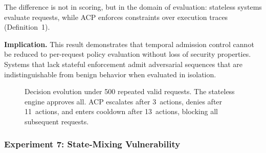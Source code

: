 \documentclass[11pt]{article}
\theoremstyle{definition}
\begin{document}
The difference is not in scoring, but in the domain of evaluation: stateless
systems evaluate requests, while ACP enforces constraints over execution traces
(Definition~1).

\textbf{Implication.}
This result demonstrates that temporal admission control cannot be reduced to
per-request policy evaluation without loss of security properties. Systems that
lack stateful enforcement admit adversarial sequences that are indistinguishable
from benign behavior when evaluated in isolation.

\begin{figure}[h]
\centering
{}
\caption{Decision evolution under 500 repeated valid requests.
The stateless engine approves all. ACP escalates after 3~actions,
denies after 11~actions, and enters cooldown after 13~actions,
blocking all subsequent requests.}
\label{fig:exp6-dynamics}
\end{figure}

\subsubsection*{Experiment 7: State-Mixing Vulnerability}
\end{document}
